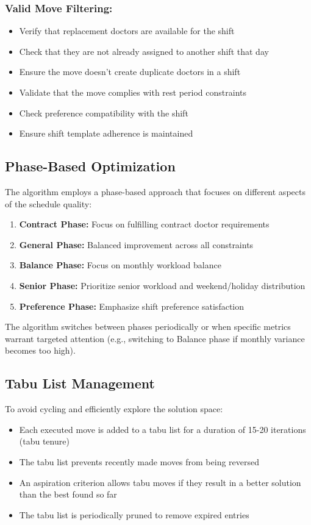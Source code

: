 \documentclass[12pt]{article}
\begin{document}
\subsubsection{Valid Move Filtering:}
\begin{itemize}
    \item Verify that replacement doctors are available for the shift
    \item Check that they are not already assigned to another shift that day
    \item Ensure the move doesn't create duplicate doctors in a shift
    \item Validate that the move complies with rest period constraints
    \item Check preference compatibility with the shift
    \item Ensure shift template adherence is maintained
\end{itemize}

\subsection{Phase-Based Optimization}

The algorithm employs a phase-based approach that focuses on different aspects of the schedule quality:

\begin{enumerate}
    \item \textbf{Contract Phase:} Focus on fulfilling contract doctor requirements
    \item \textbf{General Phase:} Balanced improvement across all constraints
    \item \textbf{Balance Phase:} Focus on monthly workload balance
    \item \textbf{Senior Phase:} Prioritize senior workload and weekend/holiday distribution
    \item \textbf{Preference Phase:} Emphasize shift preference satisfaction
\end{enumerate}

The algorithm switches between phases periodically or when specific metrics warrant targeted attention (e.g., switching to Balance phase if monthly variance becomes too high).

\subsection{Tabu List Management}

To avoid cycling and efficiently explore the solution space:
\begin{itemize}
    \item Each executed move is added to a tabu list for a duration of 15-20 iterations (tabu tenure)
    \item The tabu list prevents recently made moves from being reversed
    \item An aspiration criterion allows tabu moves if they result in a better solution than the best found so far
    \item The tabu list is periodically pruned to remove expired entries
\end{itemize}
\end{document}
